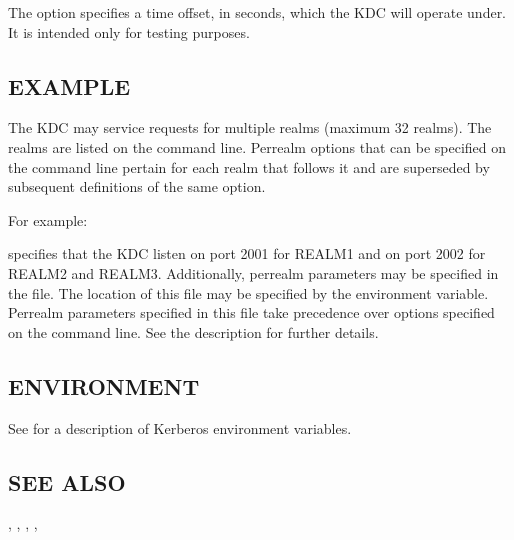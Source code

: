\documentclass[letterpaper,10pt,english]{sphinxmanual}
\begin{document}
\sphinxAtStartPar
The   option specifies a time offset, in seconds, which
the KDC will operate under.  It is intended only for testing purposes.


\subsection{EXAMPLE}
\label{\detokenize{admin/admin_commands/krb5kdc:example}}
\sphinxAtStartPar
The KDC may service requests for multiple realms (maximum 32 realms).
The realms are listed on the command line.  Per\sphinxhyphen{}realm options that can
be specified on the command line pertain for each realm that follows
it and are superseded by subsequent definitions of the same option.

\sphinxAtStartPar
For example:

\begin{sphinxVerbatim}[commandchars=\\\{\}]
          
\end{sphinxVerbatim}

\sphinxAtStartPar
specifies that the KDC listen on port 2001 for REALM1 and on port 2002
for REALM2 and REALM3.  Additionally, per\sphinxhyphen{}realm parameters may be
specified in the {\hyperref[\detokenize{admin/conf_files/kdc_conf:kdc-conf-5}]{}} file.  The location of this file
may be specified by the  environment variable.
Per\sphinxhyphen{}realm parameters specified in this file take precedence over
options specified on the command line.  See the {\hyperref[\detokenize{admin/conf_files/kdc_conf:kdc-conf-5}]{}}
description for further details.


\subsection{ENVIRONMENT}
\label{\detokenize{admin/admin_commands/krb5kdc:environment}}
\sphinxAtStartPar
See  for a description of Kerberos environment
variables.


\subsection{SEE ALSO}
\label{\detokenize{admin/admin_commands/krb5kdc:see-also}}
\sphinxAtStartPar
{\hyperref[\detokenize{admin/admin_commands/kdb5_util:kdb5-util-8}]{}}, {\hyperref[\detokenize{admin/conf_files/kdc_conf:kdc-conf-5}]{}}, {\hyperref[\detokenize{admin/conf_files/krb5_conf:krb5-conf-5}]{}},
{\hyperref[\detokenize{admin/admin_commands/kdb5_ldap_util:kdb5-ldap-util-8}]{}}, 
\end{document}
